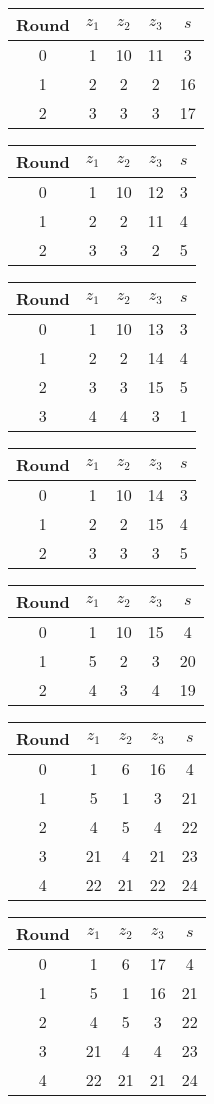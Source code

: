 \begin{multicols}{2}
\begin{tabular}{c | c | c | c | c }
Round & $z_1$ & $z_2$ & $z_3$ & $s$ \\
\hline
0 & 1 & 10 & 11 & 3 \\
1 & 2 & 2 & 2 & 16 \\
2 & 3 & 3 & 3 & 17
\end{tabular}


\begin{tabular}{c | c | c | c | c }
Round & $z_1$ & $z_2$ & $z_3$ & $s$ \\
\hline
0 & 1 & 10 & 12 & 3 \\
1 & 2 & 2 & 11 & 4 \\
2 & 3 & 3 & 2 & 5
\end{tabular}


\begin{tabular}{c | c | c | c | c }
Round & $z_1$ & $z_2$ & $z_3$ & $s$ \\
\hline
0 & 1 & 10 & 13 & 3 \\
1 & 2 & 2 & 14 & 4 \\
2 & 3 & 3 & 15 & 5 \\
3 & 4 & 4 & 3 & 1
\end{tabular}


\begin{tabular}{c | c | c | c | c }
Round & $z_1$ & $z_2$ & $z_3$ & $s$ \\
\hline
0 & 1 & 10 & 14 & 3 \\
1 & 2 & 2 & 15 & 4 \\
2 & 3 & 3 & 3 & 5
\end{tabular}


\begin{tabular}{c | c | c | c | c }
Round & $z_1$ & $z_2$ & $z_3$ & $s$ \\
\hline
0 & 1 & 10 & 15 & 4 \\
1 & 5 & 2 & 3 & 20 \\
2 & 4 & 3 & 4 & 19
\end{tabular}


\begin{tabular}{c | c | c | c | c }
Round & $z_1$ & $z_2$ & $z_3$ & $s$ \\
\hline
0 & 1 & 6 & 16 & 4 \\
1 & 5 & 1 & 3 & 21 \\
2 & 4 & 5 & 4 & 22 \\
3 & 21 & 4 & 21 & 23 \\
4 & 22 & 21 & 22 & 24
\end{tabular}


\begin{tabular}{c | c | c | c | c }
Round & $z_1$ & $z_2$ & $z_3$ & $s$ \\
\hline
0 & 1 & 6 & 17 & 4 \\
1 & 5 & 1 & 16 & 21 \\
2 & 4 & 5 & 3 & 22 \\
3 & 21 & 4 & 4 & 23 \\
4 & 22 & 21 & 21 & 24
\end{tabular}



\end{multicols}
